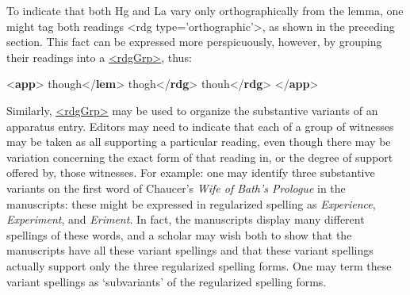To indicate that both Hg and La vary only orthographically from the lemma, one might tag both readings <rdg type='orthographic'>, as shown in the preceding section. This fact can be expressed more perspicuously, however, by grouping their readings into a \hyperref[TEI.rdgGrp]{<rdgGrp>}, thus: \par\bgroup{}\exampleFont \begin{shaded}\noindent\mbox{}{<\textbf{app}>}\mbox{}\newline 
{}though{</\textbf{lem}>}\mbox{}\newline 
{}\mbox{}\newline 
\hspace*{1em}thogh{</\textbf{rdg}>}\mbox{}\newline 
\hspace*{1em}thouh{</\textbf{rdg}>}\mbox{}\newline 
{}\mbox{}\newline 
{</\textbf{app}>}\end{shaded}\egroup\par \par
Similarly, \hyperref[TEI.rdgGrp]{<rdgGrp>} may be used to organize the substantive variants of an apparatus entry. Editors may need to indicate that each of a group of witnesses may be taken as all supporting a particular reading, even though there may be variation concerning the exact form of that reading in, or the degree of support offered by, those witnesses. For example: one may identify three substantive variants on the first word of Chaucer's \textit{Wife of Bath's Prologue} in the manuscripts: these might be expressed in regularized spelling as \textit{Experience}, \textit{Experiment}, and \textit{Eriment}. In fact, the manuscripts display many different spellings of these words, and a scholar may wish both to show that the manuscripts have all these variant spellings and that these variant spellings actually support only the three regularized spelling forms. One may term these variant spellings as ‘subvariants’ of the regularized spelling forms.\par

